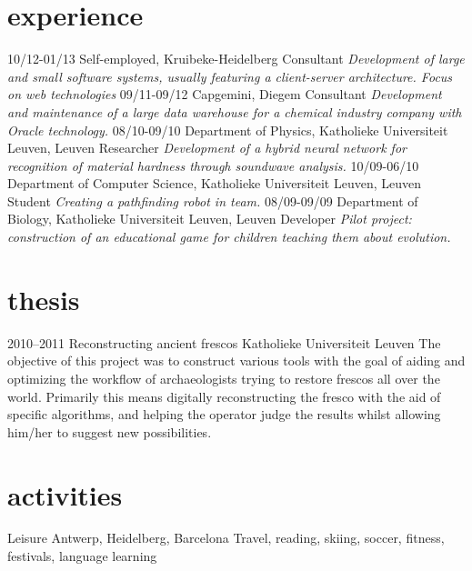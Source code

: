 \documentclass[]{friggeri-cv}
\begin{document}
\section{experience}

\begin{entrylist}
  \entry
    {10/12-01/13}
    {Self-employed, Kruibeke-Heidelberg}
    {Consultant}
    {\emph{Development of large and small software systems, usually featuring a client-server architecture. Focus on web technologies}}
  \entry
    {09/11-09/12}
    {Capgemini, Diegem}
    {Consultant}
    {\emph{Development and maintenance of a large data warehouse for a chemical industry company with Oracle technology.}}
  \entry
    {08/10-09/10}
    {Department of Physics, Katholieke Universiteit Leuven, Leuven}
    {Researcher}
    {\emph{Development of a hybrid neural network for recognition of material hardness through soundwave analysis.}}
  \entry
    {10/09-06/10}
    {Department of Computer Science, Katholieke Universiteit Leuven, Leuven}
    {Student}
    {\emph{Creating a pathfinding robot in team.}}
  \entry
    {08/09-09/09}
    {Department of Biology, Katholieke Universiteit Leuven, Leuven}
    {Developer}
    {\emph{Pilot project: construction of an educational game for children teaching them about evolution.}}
\end{entrylist}

\section{thesis}

\begin{entrylist}
  \entry
    {2010--2011}
    {Reconstructing ancient frescos}
    {Katholieke Universiteit Leuven}
    {The objective of this project was to construct various tools with the goal of aiding and optimizing the workflow of archaeologists trying to restore frescos all over the world. Primarily this means digitally reconstructing the fresco with the aid of specific algorithms, and helping the operator judge the results whilst allowing him/her to suggest new possibilities.}
\end{entrylist}

\clearpage

\section{activities}

\begin{entrylist}
  \entry
    {}
    {Leisure}
    {Antwerp, Heidelberg, Barcelona}
    {Travel, reading, skiing, soccer, fitness, festivals, language learning}
\end{entrylist}
\end{document}
